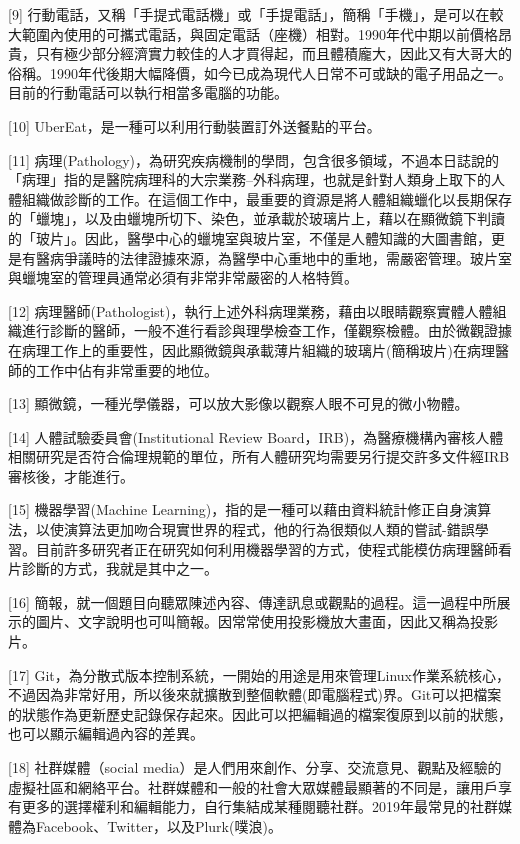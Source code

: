 \documentclass[
]{article}
\begin{document}
{[}9{]}
行動電話，又稱「手提式電話機」或「手提電話」，簡稱「手機」，是可以在較大範圍內使用的可攜式電話，與固定電話（座機）相對。1990年代中期以前價格昂貴，只有極少部分經濟實力較佳的人才買得起，而且體積龐大，因此又有大哥大的俗稱。1990年代後期大幅降價，如今已成為現代人日常不可或缺的電子用品之一。目前的行動電話可以執行相當多電腦的功能。

{[}10{]} UberEat，是一種可以利用行動裝置訂外送餐點的平台。

{[}11{]}
病理(Pathology)，為研究疾病機制的學問，包含很多領域，不過本日誌說的「病理」指的是醫院病理科的大宗業務--外科病理，也就是針對人類身上取下的人體組織做診斷的工作。在這個工作中，最重要的資源是將人體組織蠟化以長期保存的「蠟塊」，以及由蠟塊所切下、染色，並承載於玻璃片上，藉以在顯微鏡下判讀的「玻片」。因此，醫學中心的蠟塊室與玻片室，不僅是人體知識的大圖書館，更是有醫病爭議時的法律證據來源，為醫學中心重地中的重地，需嚴密管理。玻片室與蠟塊室的管理員通常必須有非常非常嚴密的人格特質。

{[}12{]}
病理醫師(Pathologist)，執行上述外科病理業務，藉由以眼睛觀察實體人體組織進行診斷的醫師，一般不進行看診與理學檢查工作，僅觀察檢體。由於微觀證據在病理工作上的重要性，因此顯微鏡與承載薄片組織的玻璃片(簡稱玻片)在病理醫師的工作中佔有非常重要的地位。

{[}13{]} 顯微鏡，一種光學儀器，可以放大影像以觀察人眼不可見的微小物體。

{[}14{]} 人體試驗委員會(Institutional Review
Board，IRB)，為醫療機構內審核人體相關研究是否符合倫理規範的單位，所有人體研究均需要另行提交許多文件經IRB審核後，才能進行。

{[}15{]} 機器學習(Machine
Learning)，指的是一種可以藉由資料統計修正自身演算法，以使演算法更加吻合現實世界的程式，他的行為很類似人類的嘗試-錯誤學習。目前許多研究者正在研究如何利用機器學習的方式，使程式能模仿病理醫師看片診斷的方式，我就是其中之一。

{[}16{]}
簡報，就一個題目向聽眾陳述內容、傳達訊息或觀點的過程。這一過程中所展示的圖片、文字說明也可叫簡報。因常常使用投影機放大畫面，因此又稱為投影片。

{[}17{]}
Git，為分散式版本控制系統，一開始的用途是用來管理Linux作業系統核心，不過因為非常好用，所以後來就擴散到整個軟體(即電腦程式)界。Git可以把檔案的狀態作為更新歷史記錄保存起來。因此可以把編輯過的檔案復原到以前的狀態，也可以顯示編輯過內容的差異。

{[}18{]} 社群媒體（social
media）是人們用來創作、分享、交流意見、觀點及經驗的虛擬社區和網絡平台。社群媒體和一般的社會大眾媒體最顯著的不同是，讓用戶享有更多的選擇權利和編輯能力，自行集結成某種閱聽社群。2019年最常見的社群媒體為Facebook、Twitter，以及Plurk(噗浪)。
\end{document}
